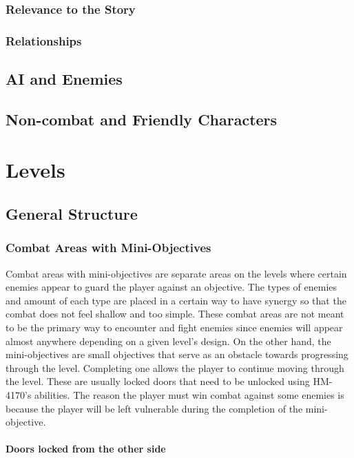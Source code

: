 \documentclass[12pt]{article}
\begin{document}
\subsubsection{Relevance to the Story}

\subsubsection{Relationships}

\subsection{AI and Enemies}

\subsection{Non-combat and Friendly Characters}

\section{Levels}

\subsection{General Structure}

\subsubsection{Combat Areas with Mini-Objectives}

Combat areas with mini-objectives are separate areas on the levels where certain enemies appear to guard the player against an objective. The types of enemies and amount of each type are placed in a certain way to have synergy so that the combat does not feel shallow and too simple. These combat areas are not meant to be the primary way to encounter and fight enemies since enemies will appear almost anywhere depending on a given level's design. On the other hand, the mini-objectives are small objectives that serve as an obstacle towards progressing through the level. Completing one allows the player to continue moving through the level. These are usually locked doors that need to be unlocked using HM-4170's abilities. The reason the player must win combat against some enemies is because the player will be left vulnerable during the completion of the mini-objective.

\paragraph{Doors locked from the other side}
\end{document}
